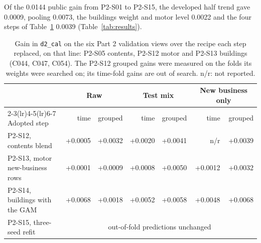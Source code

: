 \documentclass[11pt,a4paper]{article}
\newcommand{\code}[1]{\texttt{#1}}
\begin{document}
Of the 0.0144 public gain from P2-S01 to P2-S15, the developed half trend gave 0.0009, pooling 0.0073, the buildings
weight and motor level 0.0022 and the four steps of Table~\ref{tab:views} 0.0039 (Table~\ref{tab:results}).

\begin{table}[htbp]
\centering\small\setlength{\tabcolsep}{5pt}
\begin{tabular}{lrrrrrr}
\toprule
 & \multicolumn{2}{c}{Raw} & \multicolumn{2}{c}{Test mix} & \multicolumn{2}{c}{New business only}\\
\cmidrule(lr){2-3}\cmidrule(lr){4-5}\cmidrule(lr){6-7}
Adopted step & time & grouped & time & grouped & time & grouped\\
\midrule
P2-S12, contents blend & +0.0005 & +0.0032 & +0.0020 & +0.0041 & n/r & +0.0039\\
P2-S13, motor new-business rows & +0.0001 & +0.0009 & +0.0008 & +0.0050 & +0.0012 & +0.0032\\
P2-S14, buildings with the GAM & +0.0068 & +0.0018 & +0.0052 & +0.0058 & +0.0048 & +0.0068\\
P2-S15, three-seed refit & \multicolumn{6}{c}{out-of-fold predictions unchanged}\\
\bottomrule
\end{tabular}
\caption{Gain in \code{d2\_cal} on the six Part 2 validation views over the recipe each step replaced, on that line:
P2-S05 contents, P2-S12 motor and P2-S13 buildings (C044, C047, C054). The P2-S12 grouped gains were measured on the
folds its weights were searched on; its time-fold gains are out of search. n/r: not reported.}
\label{tab:views}
\end{table}
\end{document}
